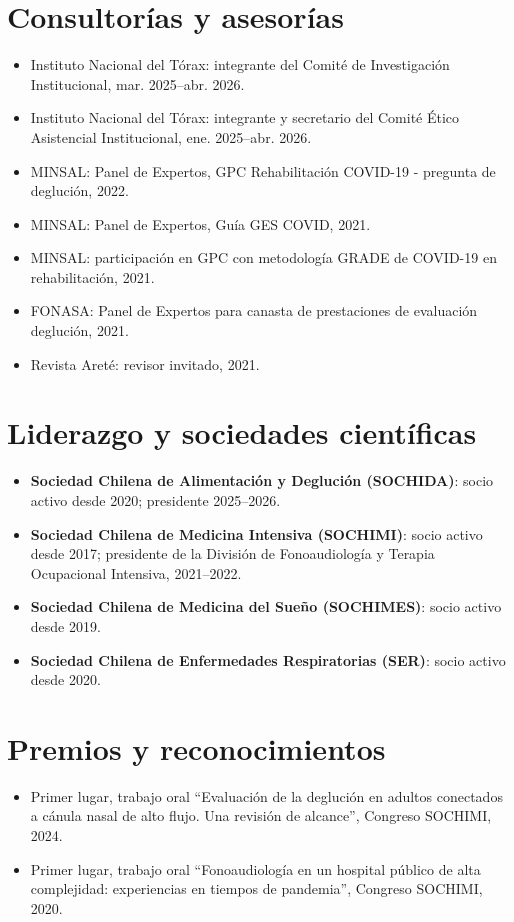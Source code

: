 \documentclass[10pt,a4paper]{article}
\begin{document}
\section*{Consultorías y asesorías}
\begin{itemize}
  \item Instituto Nacional del Tórax: integrante del Comité de Investigación Institucional, mar. 2025--abr. 2026.
  \item Instituto Nacional del Tórax: integrante y secretario del Comité Ético Asistencial Institucional, ene. 2025--abr. 2026.
  \item MINSAL: Panel de Expertos, GPC Rehabilitación COVID-19 - pregunta de deglución, 2022.
  \item MINSAL: Panel de Expertos, Guía GES COVID, 2021.
  \item MINSAL: participación en GPC con metodología GRADE de COVID-19 en rehabilitación, 2021.
  \item FONASA: Panel de Expertos para canasta de prestaciones de evaluación deglución, 2021.
  \item Revista Areté: revisor invitado, 2021.
\end{itemize}

\section*{Liderazgo y sociedades científicas}
\begin{itemize}
  \item \textbf{Sociedad Chilena de Alimentación y Deglución (SOCHIDA)}: socio activo desde 2020; presidente 2025--2026.
  \item \textbf{Sociedad Chilena de Medicina Intensiva (SOCHIMI)}: socio activo desde 2017; presidente de la División de Fonoaudiología y Terapia Ocupacional Intensiva, 2021--2022.
  \item \textbf{Sociedad Chilena de Medicina del Sueño (SOCHIMES)}: socio activo desde 2019.
  \item \textbf{Sociedad Chilena de Enfermedades Respiratorias (SER)}: socio activo desde 2020.
\end{itemize}

\section*{Premios y reconocimientos}
\begin{itemize}
  \item Primer lugar, trabajo oral ``Evaluación de la deglución en adultos conectados a cánula nasal de alto flujo. Una revisión de alcance'', Congreso SOCHIMI, 2024.
  \item Primer lugar, trabajo oral ``Fonoaudiología en un hospital público de alta complejidad: experiencias en tiempos de pandemia'', Congreso SOCHIMI, 2020.
\end{itemize}
\end{document}
